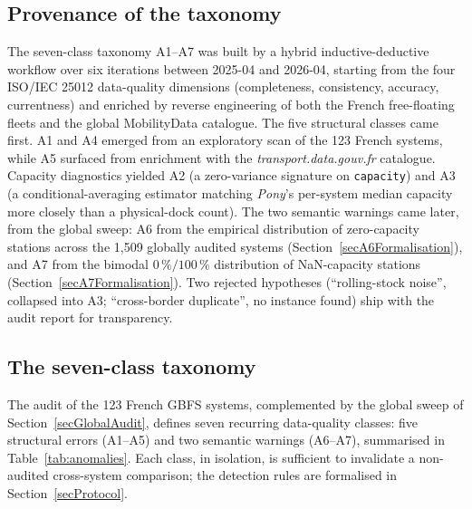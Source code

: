 \documentclass[11pt,a4paper]{article}
\begin{document}
\subsection{Provenance of the taxonomy}
The seven-class taxonomy A1--A7 was built by a hybrid
inductive-deductive workflow over six iterations between 2025-04
and 2026-04, starting from the four ISO/IEC 25012 data-quality
dimensions (completeness, consistency, accuracy, currentness)
and enriched by reverse engineering of both the French
free-floating fleets and the global MobilityData catalogue.
The five structural classes came first. A1 and A4 emerged from an
exploratory scan of the 123 French systems, while A5 surfaced from
enrichment with the \emph{transport.data.gouv.fr} catalogue. Capacity
diagnostics yielded A2 (a zero-variance signature on \texttt{capacity})
and A3 (a conditional-averaging estimator matching \emph{Pony}'s
per-system median capacity more closely than a physical-dock count). The two semantic warnings
came later, from the global sweep: A6 from the empirical
distribution of zero-capacity stations across the 1{,}509 globally
audited systems (Section~\ref{secA6Formalisation}), and A7 from the
bimodal $0\,\%/100\,\%$ distribution of NaN-capacity stations
(Section~\ref{secA7Formalisation}). Two rejected hypotheses
(``rolling-stock noise'', collapsed into A3; ``cross-border
duplicate'', no instance found) ship with the audit report
for transparency.

\subsection{The seven-class taxonomy}
\label{secTaxonomy}
The audit of the 123 French GBFS systems, complemented by the
global sweep of Section~\ref{secGlobalAudit}, defines seven
recurring data-quality classes: five structural errors
(A1--A5) and two semantic warnings (A6--A7), summarised in
Table~\ref{tab:anomalies}. Each class, in isolation, is sufficient
to invalidate a non-audited cross-system comparison; the
detection rules are formalised in Section~\ref{secProtocol}.
\end{document}
